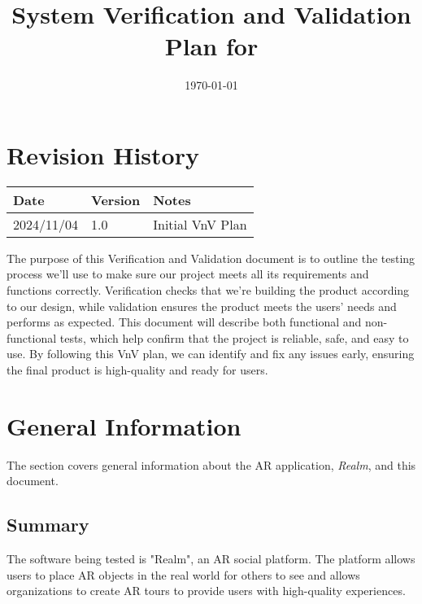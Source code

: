 \documentclass[12pt, titlepage]{article}
\begin{document}
\title{System Verification and Validation Plan for \progname{}}
\author{\authname}
\date{\today}

\maketitle


\section*{Revision History}

\begin{tabularx}{\textwidth}{p{3cm}p{2cm}X}
\toprule {\bf Date} & {\bf Version} & {\bf Notes}\\
\midrule
2024/11/04 & 1.0 & Initial VnV Plan\\
\bottomrule
\end{tabularx}

\newpage

\tableofcontents

\listoftables

\newpage


The purpose of this Verification and Validation document is to outline the testing process we’ll use to make sure our project meets all its requirements and functions correctly. Verification checks that we’re building the product according to our design, while validation ensures the product meets the users’ needs and performs as expected. This document will describe both functional and non-functional tests, which help confirm that the project is reliable, safe, and easy to use. By following this VnV plan, we can identify and fix any issues early, ensuring the final product is high-quality and ready for users.

\section{General Information}
The section covers general information about the AR application, \textit{Realm}, and this document.

\subsection{Summary}

The software being tested is "Realm", an AR social platform. The platform allows users to place AR objects in the real world for others to see and allows organizations to create AR tours to provide users with high-quality experiences.
\end{document}
